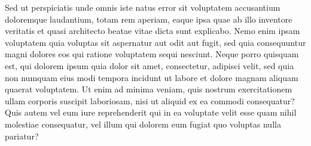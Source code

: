 \begin{acknowledgments}
    Sed ut perspiciatis unde omnis iste natus error sit voluptatem accusantium doloremque
    laudantium, totam rem aperiam, eaque ipsa quae ab illo inventore veritatis et quasi
    architecto beatae vitae dicta sunt explicabo. Nemo enim ipsam voluptatem quia voluptas
    sit aspernatur aut odit aut fugit, sed quia consequuntur magni dolores eos qui ratione
    voluptatem sequi nesciunt. Neque porro quisquam est, qui dolorem ipsum quia dolor sit
    amet, consectetur, adipisci velit, sed quia non numquam eius modi tempora incidunt ut
    labore et dolore magnam aliquam quaerat voluptatem. Ut enim ad minima veniam, quis
    nostrum exercitationem ullam corporis suscipit laboriosam, nisi ut aliquid ex ea commodi
    consequatur? Quis autem vel eum iure reprehenderit qui in ea voluptate velit esse quam nihil
    molestiae consequatur, vel illum qui dolorem eum fugiat quo voluptas nulla pariatur?
\end{acknowledgments}